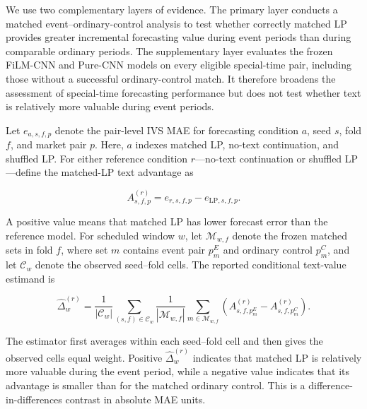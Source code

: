 We use two complementary layers of evidence. The primary layer conducts a matched event--ordinary-control analysis to test whether correctly matched LP provides greater incremental forecasting value during event periods than during comparable ordinary periods. The supplementary layer evaluates the frozen FiLM-CNN and Pure-CNN models on every eligible special-time pair, including those without a successful ordinary-control match. It therefore broadens the assessment of special-time forecasting performance but does not test whether text is relatively more valuable during event periods.


Let $e_{a,s,f,p}$ denote the pair-level IVS MAE for forecasting condition $a$,
seed $s$, fold $f$, and market pair $p$.  Here, $a$ indexes matched LP,
no-text continuation, and shuffled LP.  For either reference condition
$r$---no-text continuation or shuffled LP---define the matched-LP text
advantage as

\begin{equation}\label{eq:ch3:rq4_text_advantage}
A^{(r)}_{s,f,p}
=
e_{r,s,f,p}-e_{\mathrm{LP},s,f,p}.
\end{equation}

A positive value means that matched LP has lower forecast error than the
reference model.  For scheduled window $w$, let $\mathcal M_{w,f}$ denote the
frozen matched sets in fold $f$, where set $m$ contains event pair $p^E_m$ and
ordinary control $p^C_m$, and let $\mathcal C_w$ denote the observed seed--fold
cells.  The reported conditional text-value estimand is

\begin{equation}\label{eq:ch3:rq4_conditional_increment}
\widehat{\Delta}^{(r)}_w
=
\frac{1}{|\mathcal C_w|}
\sum_{(s,f)\in\mathcal C_w}
\frac{1}{|\mathcal M_{w,f}|}
\sum_{m\in\mathcal M_{w,f}}
\left(
A^{(r)}_{s,f,p^E_m}-A^{(r)}_{s,f,p^C_m}
\right).
\end{equation}


The estimator first averages within each seed--fold cell and then gives the
observed cells equal weight.  Positive $\widehat{\Delta}^{(r)}_w$ indicates
that matched LP is relatively more valuable during the event period, while a
negative value indicates that its advantage is smaller than for the matched
ordinary control.  This is a difference-in-differences contrast in absolute
MAE units.




